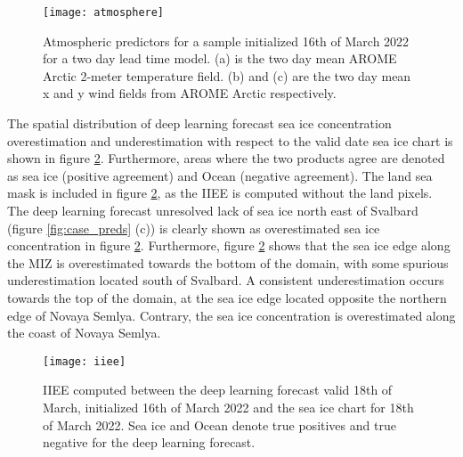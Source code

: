 \documentclass[../main/thesis.tex]{subfiles}
\begin{document}
\begin{figure}
    \centering
    \texttt{[image: atmosphere]}
    \caption{\label{fig:case_atmos}Atmospheric predictors for a sample initialized 16th of March 2022 for a two day lead time model. (a) is the two day mean AROME Arctic 2-meter temperature field. (b) and (c) are the two day mean x and y wind fields from AROME Arctic respectively.}
\end{figure}

The spatial distribution of deep learning forecast sea ice concentration overestimation and underestimation \citep{Goessling2016} with respect to the valid date sea ice chart is shown in figure \ref{fig:case_iiee}. Furthermore, areas where the two products agree are denoted as sea ice (positive agreement) and Ocean (negative agreement). The land sea mask is included in figure \ref{fig:case_iiee}, as the IIEE is computed without the land pixels. The deep learning forecast unresolved lack of sea ice north east of Svalbard (figure \ref{fig:case_preds} (c)) is clearly shown as overestimated sea ice concentration in figure \ref{fig:case_iiee}. Furthermore, figure \ref{fig:case_iiee} shows that the sea ice edge along the MIZ is overestimated towards the bottom of the domain, with some spurious underestimation located south of Svalbard. A consistent underestimation occurs towards the top of the domain, at the sea ice edge located opposite the northern edge of Novaya Semlya. Contrary, the sea ice concentration is overestimated along the coast of Novaya Semlya.

\begin{figure}
    \centering
    \texttt{[image: iiee]}
    \caption{\label{fig:case_iiee}IIEE computed between the deep learning forecast valid 18th of March, initialized 16th of March 2022 and the sea ice chart for 18th of March 2022. Sea ice and Ocean denote true positives and true negative for the deep learning forecast.}
\end{figure}




\biblio
\end{document}
